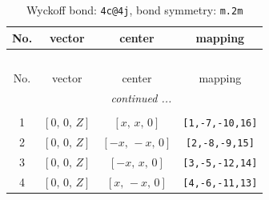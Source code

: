 \documentclass[fleqn,8pt]{jsarticle}
\begin{document}
\renewcommand{\arraystretch}{1.2}
\begin{longtable}{cccc}
\caption{Wyckoff bond: {\tt 4c@4j}, bond symmetry: {\tt m.2m}}
 \\
 \hline \hline
No. & vector & center & mapping \\ \hline \endfirsthead

\multicolumn{3}{l}{\tablename\ \thetable{}} \\
 \hline \hline
No. & vector & center & mapping \\ \hline \endhead

 \hline \hline
\multicolumn{3}{r}{\footnotesize\it continued ...} \\ \endfoot

 \hline \hline
\multicolumn{3}{r}{} \\ \endlastfoot

1 & $\left[ 0,\, 0,\, Z \right]$ & $\left[ x,\, x,\, 0 \right]$ & {\tt [1,-7,-10,16]} \\ \hline
2 & $\left[ 0,\, 0,\, Z \right]$ & $\left[ - x,\, - x,\, 0 \right]$ & {\tt [2,-8,-9,15]} \\ \hline
3 & $\left[ 0,\, 0,\, Z \right]$ & $\left[ - x,\, x,\, 0 \right]$ & {\tt [3,-5,-12,14]} \\ \hline
4 & $\left[ 0,\, 0,\, Z \right]$ & $\left[ x,\, - x,\, 0 \right]$ & {\tt [4,-6,-11,13]} \\
\end{longtable}
\renewcommand{\arraystretch}{1.2}
\end{document}
